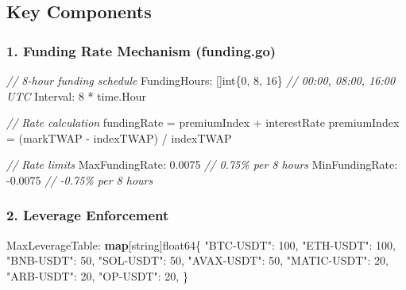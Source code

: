 \documentclass[
]{article}
\newenvironment{Shaded}{}{}
\newcommand{\CommentTok}[1]{\textcolor[rgb]{0.38,0.63,0.69}{\textit{#1}}}
\newcommand{\DataTypeTok}[1]{\textcolor[rgb]{0.56,0.13,0.00}{#1}}
\newcommand{\DecValTok}[1]{\textcolor[rgb]{0.25,0.63,0.44}{#1}}
\newcommand{\FloatTok}[1]{\textcolor[rgb]{0.25,0.63,0.44}{#1}}
\newcommand{\KeywordTok}[1]{\textcolor[rgb]{0.00,0.44,0.13}{\textbf{#1}}}
\newcommand{\NormalTok}[1]{#1}
\newcommand{\OperatorTok}[1]{\textcolor[rgb]{0.40,0.40,0.40}{#1}}
\newcommand{\StringTok}[1]{\textcolor[rgb]{0.25,0.44,0.63}{#1}}
\begin{document}
\subsection{Key Components}\label{key-components}

\subsubsection{1. Funding Rate Mechanism
(funding.go)}\label{1-funding-rate-mechanism-fundinggo}

\begin{Shaded}
\begin{Highlighting}[]
\CommentTok{// 8{-}hour funding schedule}
\NormalTok{FundingHours}\OperatorTok{:} \OperatorTok{[]}\DataTypeTok{int}\OperatorTok{\{}\DecValTok{0}\OperatorTok{,} \DecValTok{8}\OperatorTok{,} \DecValTok{16}\OperatorTok{\}}  \CommentTok{// 00:00, 08:00, 16:00 UTC}
\NormalTok{Interval}\OperatorTok{:} \DecValTok{8} \OperatorTok{*}\NormalTok{ time}\OperatorTok{.}\NormalTok{Hour}

\CommentTok{// Rate calculation}
\NormalTok{fundingRate }\OperatorTok{=}\NormalTok{ premiumIndex }\OperatorTok{+}\NormalTok{ interestRate}
\NormalTok{premiumIndex }\OperatorTok{=} \OperatorTok{(}\NormalTok{markTWAP }\OperatorTok{{-}}\NormalTok{ indexTWAP}\OperatorTok{)} \OperatorTok{/}\NormalTok{ indexTWAP}

\CommentTok{// Rate limits}
\NormalTok{MaxFundingRate}\OperatorTok{:} \FloatTok{0.0075}   \CommentTok{// 0.75\% per 8 hours}
\NormalTok{MinFundingRate}\OperatorTok{:} \OperatorTok{{-}}\FloatTok{0.0075}  \CommentTok{// {-}0.75\% per 8 hours}
\end{Highlighting}
\end{Shaded}

\subsubsection{2. Leverage Enforcement}\label{2-leverage-enforcement}

\begin{Shaded}
\begin{Highlighting}[]
\NormalTok{MaxLeverageTable}\OperatorTok{:} \KeywordTok{map}\OperatorTok{[}\DataTypeTok{string}\OperatorTok{]}\DataTypeTok{float64}\OperatorTok{\{}
    \StringTok{"BTC{-}USDT"}\OperatorTok{:}   \DecValTok{100}\OperatorTok{,}
    \StringTok{"ETH{-}USDT"}\OperatorTok{:}   \DecValTok{100}\OperatorTok{,}
    \StringTok{"BNB{-}USDT"}\OperatorTok{:}   \DecValTok{50}\OperatorTok{,}
    \StringTok{"SOL{-}USDT"}\OperatorTok{:}   \DecValTok{50}\OperatorTok{,}
    \StringTok{"AVAX{-}USDT"}\OperatorTok{:}  \DecValTok{50}\OperatorTok{,}
    \StringTok{"MATIC{-}USDT"}\OperatorTok{:} \DecValTok{20}\OperatorTok{,}
    \StringTok{"ARB{-}USDT"}\OperatorTok{:}   \DecValTok{20}\OperatorTok{,}
    \StringTok{"OP{-}USDT"}\OperatorTok{:}    \DecValTok{20}\OperatorTok{,}
\OperatorTok{\}}
\end{Highlighting}
\end{Shaded}
\end{document}
